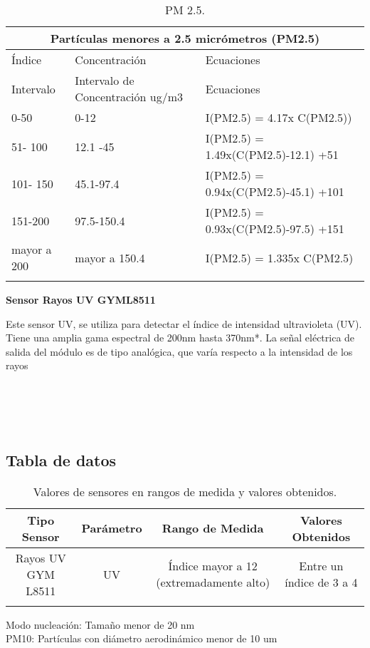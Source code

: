 \documentclass[10pt,a4paper]{article}
\begin{document}
\begin{longtable}{| p{2.2cm}| p{4.2cm} | p{6.2cm}| }
\hline
\multicolumn{3}{|c|}{Partículas menores a 2.5 micrómetros (PM2.5)} \\
\hline
Índice & Concentración & Ecuaciones \\
\hline \hline
Intervalo & Intervalo de Concentración ug/m3 & Ecuaciones \\ \hline
0-50 & 0-12 & I(PM2.5) = 4.17x C(PM2.5)) \\ \hline
51- 100 & 12.1 -45 & I(PM2.5) = 1.49x(C(PM2.5)-12.1) +51 \\ \hline
101- 150 & 45.1-97.4 & I(PM2.5) = 0.94x(C(PM2.5)-45.1) +101 \\ \hline
151-200 & 97.5-150.4 & I(PM2.5) = 0.93x(C(PM2.5)-97.5) +151 \\ \hline
mayor a 200 & mayor a 150.4 & I(PM2.5) = 1.335x C(PM2.5) \\ \hline
\caption{ PM 2.5.}
\end{longtable}


\textbf {Sensor Rayos UV GYML8511}

Este sensor UV, se utiliza para detectar el índice de intensidad ultravioleta (UV). Tiene una amplia gama espectral de 200nm hasta 370nm*. La señal eléctrica de salida del módulo es de tipo analógica, que varía respecto a la intensidad de los rayos \\\\\\\\\\

\subsection{Tabla de datos}

\begin{longtable}{| c | c | c | c |}  
\hline
\textbf {Tipo Sensor} & \textbf {Parámetro} &  \textbf {Rango de Medida} & \textbf  {Valores Obtenidos} \\  \hline
 Rayos UV GYM L8511 & UV & Índice mayor a 12 (extremadamente alto) & Entre un índice de 3 a 4  \\ \hline
\caption{Valores de sensores en rangos de medida y valores obtenidos.}
\end{longtable}


Modo nucleación: Tamaño menor de 20 nm \\

PM10: Partículas con diámetro aerodinámico menor de 10 um \\
\end{document}
